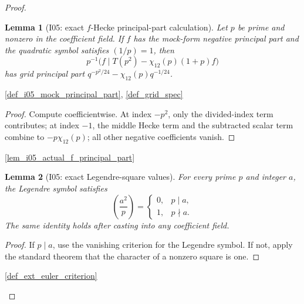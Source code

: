 \documentclass[11pt,a4paper]{article}
\numberwithin{equation}{section}
\theoremstyle{plain}\newtheorem{theorem}{Theorem}[section]\newaliascnt{proposition}{theorem}\newtheorem{proposition}[proposition]{Proposition}\aliascntresetthe{proposition}\newaliascnt{lemma}{theorem}\newtheorem{lemma}[lemma]{Lemma}\aliascntresetthe{lemma}
\theoremstyle{definition}\newaliascnt{definition}{theorem}\newtheorem{definition}[definition]{Definition}\aliascntresetthe{definition}\newaliascnt{notation}{theorem}\newtheorem{notation}[notation]{Notation}\aliascntresetthe{notation}
\providecommand{\lean}[1]{}\providecommand{\leanok}{}
\begin{document}
\begin{proof}
\begin{lemma}[I05: exact \(f\)-Hecke principal-part calculation]\label{lem_i05_f_hecke_principal_part}\lean{SptCM.Analytic.Repaired.fHeckeDifference_hasGridPrincipalPart}\leanok
Let \(p\) be prime and nonzero in the coefficient field.  If \(f\) has the
mock-form negative principal part and the quadratic symbol satisfies
\((1/p)=1\), then
\[
 p^{-1}\bigl(f\mid T(p^2)-\chi_{12}(p)(1+p)f\bigr)
\]
has grid principal part
\(q^{-p^2/24}-\chi_{12}(p)q^{-1/24}\).
\end{lemma}
\begin{uses-statement}\ref{def_i05_mock_principal_part}, \ref{def_grid_spec}\end{uses-statement}
\begin{proof}
Compute coefficientwise.  At index \(-p^2\), only the divided-index term
contributes; at index \(-1\), the middle Hecke term and the subtracted scalar
term combine to \(-p\chi_{12}(p)\); all other negative coefficients vanish.
\end{proof}
\begin{uses-proof}\ref{lem_i05_actual_f_principal_part}\end{uses-proof}

\begin{lemma}[I05: exact Legendre-square values]\label{lem_i05_legendre_square_values}\lean{SptCM.Analytic.Repaired.heckeLegendreCast_square}\leanok
For every prime \(p\) and integer \(a\), the Legendre symbol satisfies
\[
 \left(\frac{a^2}{p}\right)=
 \begin{cases}0,&p\mid a,\\1,&p\nmid a.\end{cases}
\]
The same identity holds after casting into any coefficient field.
\end{lemma}
\begin{proof}
If \(p\mid a\), use the vanishing criterion for the Legendre symbol.  If
not, apply the standard theorem that the character of a nonzero square is
one.
\end{proof}
\begin{uses-proof}\ref{def_ext_euler_criterion}\end{uses-proof}


\end{proof}
\end{document}
